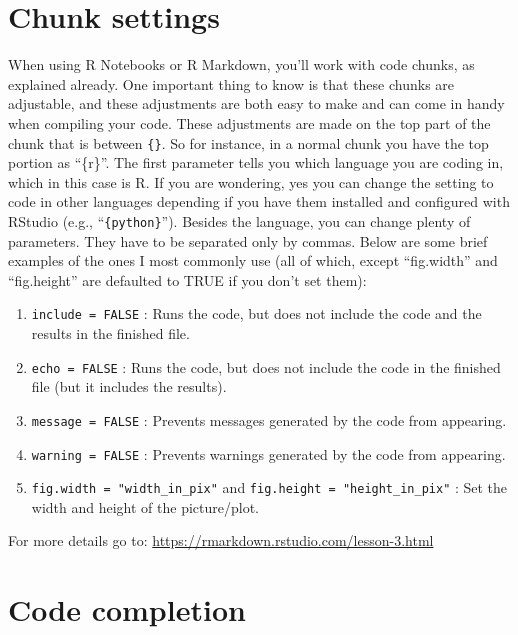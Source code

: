 \documentclass[
]{book}
\providecommand{\tightlist}{%
  \setlength{\itemsep}{0pt}\setlength{\parskip}{0pt}}
\begin{document}
\hypertarget{chunk-settings}{%
\section{Chunk settings}\label{chunk-settings}}

When using R Notebooks or R Markdown, you'll work with code chunks, as explained already.
One important thing to know is that these chunks are adjustable, and these adjustments are both easy to make and can come in handy when compiling your code.
These adjustments are made on the top part of the chunk that is between \texttt{\{\}}.
So for instance, in a normal chunk you have the top portion as ``\{r\}''.
The first parameter tells you which language you are coding in, which in this case is R.
If you are wondering, yes you can change the setting to code in other languages depending if you have them installed and configured with RStudio (e.g., ``\texttt{\{python\}}'').
Besides the language, you can change plenty of parameters.
They have to be separated only by commas.
Below are some brief examples of the ones I most commonly use (all of which, except ``fig.width'' and ``fig.height'' are defaulted to TRUE if you don't set them):

\begin{enumerate}
\def\labelenumi{\arabic{enumi}.}
\tightlist
\item
  \texttt{include\ =\ FALSE} : Runs the code, but does not include the code and the results in the finished file.
\item
  \texttt{echo\ =\ FALSE} : Runs the code, but does not include the code in the finished file (but it includes the results).
\item
  \texttt{message\ =\ FALSE} : Prevents messages generated by the code from appearing.
\item
  \texttt{warning\ =\ FALSE} : Prevents warnings generated by the code from appearing.
\item
  \texttt{fig.width\ =\ "width\_in\_pix"} and \texttt{fig.height\ =\ "height\_in\_pix"} : Set the width and height of the picture/plot.
\end{enumerate}

For more details go to: \url{https://rmarkdown.rstudio.com/lesson-3.html}

\hypertarget{code-completion}{%
\section{Code completion}\label{code-completion}}
\end{document}
